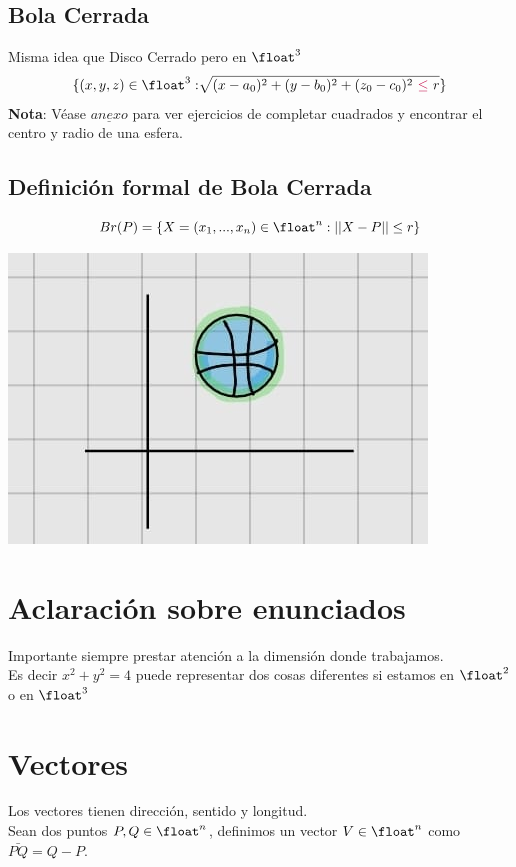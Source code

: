 \documentclass[10pt,a4paper]{article}
\begin{document}
\subsection*{Bola Cerrada}
Misma idea que Disco Cerrado pero en $\float^{3}$
\[\{(x, y, z) \in \float^{3}: \sqrt[]{(x - a_{0})^{2} + (y - b_{0})^{2} + (z_{0} - c_{0})^{2} \ \textcolor{purple}{\le} \ r}\}\]
\textbf{Nota}: Véase $\hyperref[subsec:completar_cuadrados_esfera]{\underline{anexo}}$ para ver ejercicios de completar cuadrados y encontrar el centro y radio de una esfera.
\subsection*{Definición formal de Bola Cerrada}
\[ Br(P) = \{X = (x_{1}, ..., x_{n}) \in \float^{n} : ||X-P|| \le r\}\]
\begin{center}
    \begin{minipage}[b]{0.3\textwidth}
        \includegraphics[width=\linewidth]{assets/bola_cerrada.jpg}
        \centering
        \label{fig:bola_cerrada}
    \end{minipage}
\end{center}
\section*{Aclaración sobre enunciados}
Importante siempre prestar atención a la dimensión donde trabajamos. \\
Es decir $x^{2} + y^{2} = 4$ puede representar dos cosas diferentes si estamos en $\float^{2}$ o en $\float^{3}$
\section*{Vectores}
Los vectores tienen dirección, sentido y longitud. \\
Sean dos puntos $P, Q \in \float^{n}$, definimos un vector $V \in \float^{n}$ como $ \bar{PQ} = Q - P$.
\end{document}
